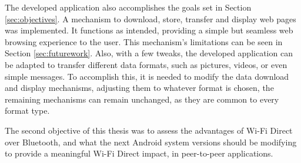 The developed application also accomplishes the goals set in Section \ref{sec:objectives}. A mechanism to download, store, transfer and display web pages was implemented. It functions as intended, providing a simple but seamless web browsing experience to the user. This mechanism's limitations can be seen in Section \ref{sec:futurework}. Also, with a few tweaks, the developed application can be adapted to transfer different data formats, such as pictures, videos, or even simple messages. To accomplish this, it is needed to modify the data download and display mechanisms, adjusting them to whatever format is chosen, the remaining mechanisms can remain unchanged, as they are common to every format type.

The second objective of this thesis was to assess the advantages of Wi-Fi Direct over Bluetooth, and what the next Android system versions should be modifying to provide a meaningful Wi-Fi Direct impact, in peer-to-peer applications. 




